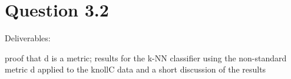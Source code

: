 \section*{Question 3.2}
Deliverables:

proof that d is a metric; results for the k-NN classifier using the non-standard metric d applied to the knollC data and a short discussion of the results
